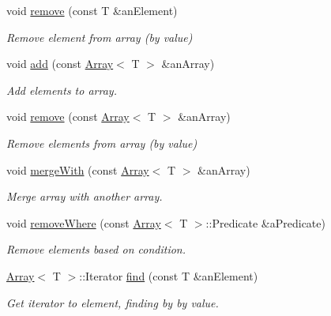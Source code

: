 \begin{DoxyCompactItemize}
void \hyperlink{classlibrary_1_1core_1_1ctnr_1_1_array_a8e295703797d6e41dad7a45e4101a6db}{remove} (const T \&an\+Element)
\begin{DoxyCompactList}\small\item\em Remove element from array (by value) \end{DoxyCompactList}\item 
void \hyperlink{classlibrary_1_1core_1_1ctnr_1_1_array_a8dd701c76ba2659ee2e438cff70fa971}{add} (const \hyperlink{classlibrary_1_1core_1_1ctnr_1_1_array}{Array}$<$ T $>$ \&an\+Array)
\begin{DoxyCompactList}\small\item\em Add elements to array. \end{DoxyCompactList}\item 
void \hyperlink{classlibrary_1_1core_1_1ctnr_1_1_array_ab37ca6fc14eefd1336544e05ba1b4d0e}{remove} (const \hyperlink{classlibrary_1_1core_1_1ctnr_1_1_array}{Array}$<$ T $>$ \&an\+Array)
\begin{DoxyCompactList}\small\item\em Remove elements from array (by value) \end{DoxyCompactList}\item 
void \hyperlink{classlibrary_1_1core_1_1ctnr_1_1_array_abe72cec38e65761df3eaddcfa9b7a44a}{merge\+With} (const \hyperlink{classlibrary_1_1core_1_1ctnr_1_1_array}{Array}$<$ T $>$ \&an\+Array)
\begin{DoxyCompactList}\small\item\em Merge array with another array. \end{DoxyCompactList}\item 
void \hyperlink{classlibrary_1_1core_1_1ctnr_1_1_array_a322b1bfc3a93ea18bf68eb0cff69e6d3}{remove\+Where} (const \hyperlink{classlibrary_1_1core_1_1ctnr_1_1_array}{Array}$<$ T $>$\+::Predicate \&a\+Predicate)
\begin{DoxyCompactList}\small\item\em Remove elements based on condition. \end{DoxyCompactList}\item 
\hyperlink{classlibrary_1_1core_1_1ctnr_1_1_array}{Array}$<$ T $>$\+::Iterator \hyperlink{classlibrary_1_1core_1_1ctnr_1_1_array_afece85f642e3c623bac197e25ad2d4ec}{find} (const T \&an\+Element)
\begin{DoxyCompactList}\small\item\em Get iterator to element, finding by by value. \end{DoxyCompactList}\end{DoxyCompactItemize}
